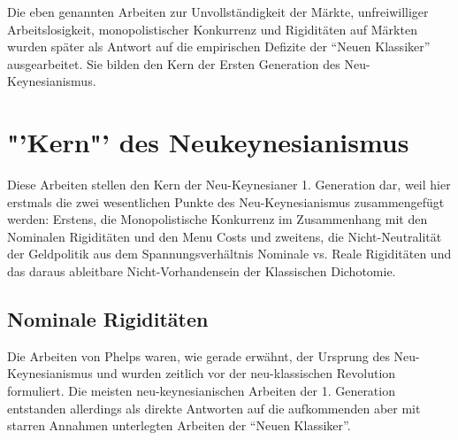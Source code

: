 Die eben genannten Arbeiten zur Unvollständigkeit der Märkte, unfreiwilliger Arbeitslosigkeit, monopolistischer Konkurrenz und Rigiditäten auf Märkten wurden später als Antwort auf die empirischen Defizite der "`Neuen Klassiker"' ausgearbeitet. Sie bilden den Kern der Ersten Generation des Neu-Keynesianismus.


\section{"'Kern"' des Neukeynesianismus}
\label{Kern}

Diese Arbeiten stellen den Kern der Neu-Keynesianer 1. Generation dar, weil hier erstmals die zwei wesentlichen Punkte des Neu-Keynesianismus zusammengefügt werden: Erstens, die Monopolistische Konkurrenz im Zusammenhang mit den Nominalen Rigiditäten und den Menu Costs und zweitens, die Nicht-Neutralität der Geldpolitik aus dem Spannungsverhältnis Nominale vs. Reale Rigiditäten und das daraus ableitbare Nicht-Vorhandensein der Klassischen Dichotomie. \parencite{RomerDavid1993}

\subsection{Nominale Rigiditäten}
\label{Nominale Rigiditäten}

Die Arbeiten von Phelps waren, wie gerade erwähnt, der Ursprung des Neu-Keynesianismus und wurden zeitlich vor der neu-klassischen Revolution formuliert. Die meisten neu-keynesianischen Arbeiten der 1. Generation entstanden allerdings als direkte Antworten auf die aufkommenden aber mit starren Annahmen unterlegten Arbeiten der "`Neuen Klassiker"'.

